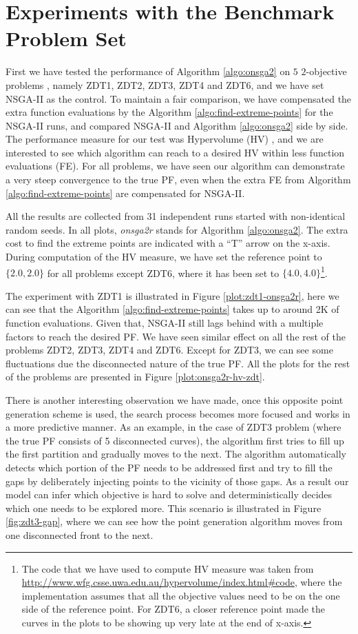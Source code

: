 \documentclass[journal]{IEEEtran}
\begin{document}
\section{Experiments with the Benchmark Problem Set}
\label{sec:onsga2r-zdt}
First we have tested the performance of Algorithm \ref{algo:onsga2} on \(5\) \(2\)-objective problems \cite{zdt-set}, namely ZDT1, ZDT2, ZDT3, ZDT4 and ZDT6, and we have set NSGA-II as the control. To maintain a fair comparison, we have compensated the extra function evaluations by the Algorithm \ref{algo:find-extreme-points} for the NSGA-II runs, and compared NSGA-II and Algorithm \ref{algo:onsga2} side by side. The performance measure for our test was Hypervolume (HV) \cite{wfg}, and we are interested to see which algorithm can reach to a desired HV within less function evaluations (FE). For all problems, we have seen our algorithm can demonstrate a very steep convergence to the true PF, even when the extra FE from Algorithm \ref{algo:find-extreme-points} are compensated for NSGA-II. 

All the results are collected from 31 independent runs started with non-identical random seeds. In all plots, \textit{onsga2r} stands for Algorithm \ref{algo:onsga2}. The extra cost to find the extreme points are indicated with a ``T'' arrow on the x-axis. During computation of the HV measure, we have set the reference point to \(\{2.0,2.0\}\) for all problems except ZDT6, where it has been set to \(\{4.0, 4.0\}\)\footnote{The code that we have used to compute HV measure was taken from \url{http://www.wfg.csse.uwa.edu.au/hypervolume/index.html#code}, where the implementation assumes that all the objective values need to be on the one side of the reference point. For ZDT6, a closer reference point made the curves in the plots to be showing up very late at the end of x-axis.}.

The experiment with ZDT1 is illustrated in Figure \ref{plot:zdt1-onsga2r}, here we can see that the Algorithm \ref{algo:find-extreme-points} takes up to around 2K of function evaluations. Given that, NSGA-II still lags behind with a multiple factors to reach the desired PF. We have seen similar effect on all the rest of the problems ZDT2, ZDT3, ZDT4 and ZDT6. Except for ZDT3, we can see some fluctuations due the disconnected nature of the true PF. All the plots for the rest of the problems are presented in Figure \ref{plot:onsga2r-hv-zdt}.

There is another interesting observation we have made, once this opposite point generation scheme is used, the search process becomes more focused and works in a more predictive manner. As an example, in the case of ZDT3 problem (where the true PF consists of 5 disconnected curves), the algorithm first tries to fill up the first partition and gradually moves to the next. The algorithm automatically detects which portion of the PF needs to be addressed first and try to fill the gaps by deliberately injecting points to the vicinity of those gaps. As a result our model can infer which objective is hard to solve and deterministically decides which one needs to be explored more. This scenario is illustrated in Figure \ref{fig:zdt3-gap}, where we can see how the point generation algorithm moves from one disconnected front to the next.
\end{document}
